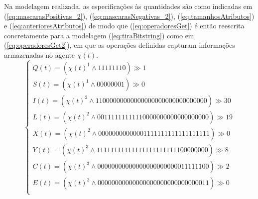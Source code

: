 Na modelagem realizada, as especificações às quantidades são como indicadas em (\ref{eq:mascarasPositivas_2}), (\ref{eq:mascarasNegativas_2}), (\ref{eq:tamanhosAtributos}) e (\ref{eq:anterioresAtributos}) de modo que (\ref{eq:operadoresGet}) é então reescrita concretamente para a modelagem (\ref{eq:tiraBitstring}) como em (\ref{eq:operadoresGet2}), em que as operações definidas capturam informações armazenadas no agente $\chi(t)$.
\begin{equation}
 \begin{cases}
 Q(t) = (\chi(t)^1\wedge 11111110) \gg 1 \\
 S(t) = (\chi(t)^1\wedge 00000001) \gg 0 \\
 
 I(t) = (\chi(t)^2\wedge 11000000000000000000000000000000) \gg 30 \\
 L(t) = (\chi(t)^2\wedge 00111111111110000000000000000000) \gg 19 \\
 X(t) = (\chi(t)^2\wedge 00000000000001111111111111111111) \gg 0  \\
 
 Y(t) = (\chi(t)^3\wedge 11111111111111111111111100000000) \gg 8 \\
 C(t) = (\chi(t)^3\wedge 00000000000000000000000011111100) \gg 2 \\
 E(t) = (\chi(t)^3\wedge 00000000000000000000000000000011) \gg 0 \\
 \end{cases}
 \label{eq:operadoresGet2}
\end{equation}

